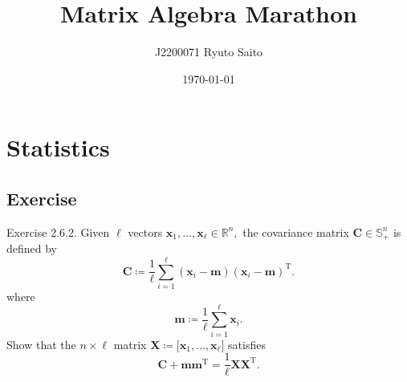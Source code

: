 \documentclass{article}
\title{Matrix Algebra Marathon}
\author{J2200071 Ryuto Saito}
\date{\today}
\theoremstyle{plain}
\begin{document}
\maketitle

\section{Statistics}

\subsection{Exercise}

\begin{itembox}[l]{Exercise 2.6.2.}
	Given $\ell$ vectors
	\begin{math}
		\bm{x}_1 , \ldots , \bm{x}_{\ell} \in \mathbb{R}^n ,
	\end{math}
	the covariance matrix
	\begin{math}
		\bm{C} \in \mathbb{S}_+^n
	\end{math}
	is defined by
	\begin{equation}
		\bm{C} \coloneq \dfrac{1}{\ell} \sum_{i=1}^{\ell} (\bm{x}_i - \bm{m}) (\bm{x}_i - \bm{m})^\mathrm{T} .
	\end{equation}
	where
	\begin{equation}
		\bm{m} \coloneq \dfrac{1}{\ell} \sum_{i=1}^{\ell} \bm{x}_i .
	\end{equation}
	Show that the $n \times \ell$ matrix
	\begin{math}
		\bm{X} \coloneq \lbrack \bm{x}_1 , \ldots , \bm{x}_{\ell} \rbrack
	\end{math}
	satisfies
	\begin{equation}
		\label{ex262}
		\bm{C} + \bm{m} \bm{m}^\mathrm{T} = \dfrac{1}{\ell} \bm{X} \bm{X}^\mathrm{T} .
	\end{equation}
\end{itembox}
\end{document}

